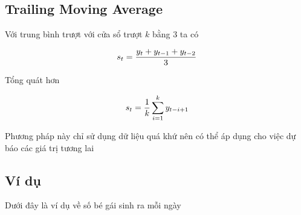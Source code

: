 \documentclass[
]{book}
\begin{document}
\subsection{Trailing Moving Average}\label{trailing-moving-average}

Với trung bình trượt với cửa sổ trượt \(k\) bằng 3 ta có

\[\begin{aligned}
\Large s_{t} = \frac{y_{t} + y_{t - 1} + y_{t - 2}}{3}
\end{aligned}\]

Tổng quát hơn

\[\begin{aligned}
\Large s_{t} = \frac{1}{k} \sum^{k}_{i=1}{y_{t-i+1}}
\end{aligned}\]

Phương pháp này chỉ sử dụng dữ liệu quá khứ nên có thể áp dụng cho việc dự báo các giá trị tương lai

\subsection{Ví dụ}\label{vuxed-dux1ee5}

Dưới đây là ví dụ về số bé gái sinh ra mỗi ngày
\end{document}
